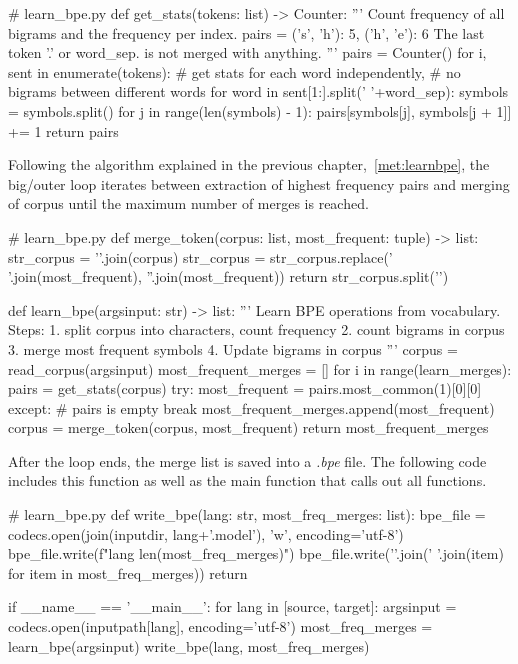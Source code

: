 \begin{python}
# learn_bpe.py
def get_stats(tokens: list) -> Counter:
  '''
  Count frequency of all bigrams and the frequency per index.
  pairs = {
    ('s', 'h'): 5,
    ('h', 'e'): 6
  }
  The last token '.' or word_sep. is not merged with anything.
  '''
  pairs = Counter()
  for i, sent in enumerate(tokens):
    # get stats for each word independently, 
    # no bigrams between different words
    for word in sent[1:].split(' '+word_sep):
      symbols = symbols.split()
      for j in range(len(symbols) - 1):
        pairs[symbols[j], symbols[j + 1]] += 1
  return pairs
\end{python}

Following the algorithm explained in the previous chapter,~\ref{met:learnbpe}, the big/outer loop iterates between extraction of highest frequency pairs and merging of corpus until the maximum number of merges is reached.

\begin{python}
# learn_bpe.py
def merge_token(corpus: list, most_frequent: tuple) -> list:
  str_corpus = '\n'.join(corpus)
  str_corpus = str_corpus.replace(' '.join(most_frequent), ''.join(most_frequent))
  return str_corpus.split('\n')

def learn_bpe(argsinput: str) -> list:
  '''
  Learn BPE operations from vocabulary. Steps:
  1. split corpus into characters, count frequency
  2. count bigrams in corpus
  3. merge most frequent symbols
  4. Update bigrams in corpus 
  '''
  corpus = read_corpus(argsinput)
  most_frequent_merges = []
  for i in range(learn_merges):
    pairs = get_stats(corpus)
    try:
      most_frequent = pairs.most_common(1)[0][0]
    except:
      # pairs is empty
      break
    most_frequent_merges.append(most_frequent)
    corpus = merge_token(corpus, most_frequent)
  return most_frequent_merges
\end{python}

After the loop ends, the merge list is saved into a \emph{.bpe} file. The following code includes this function as well as the main function that calls out all functions.

\begin{python}
# learn_bpe.py
def write_bpe(lang: str, most_freq_merges: list):
  bpe_file = codecs.open(join(inputdir, lang+'.model'), 'w', encoding='utf-8')
  bpe_file.write(f"{lang} {len(most_freq_merges)}\n")
  bpe_file.write('\n'.join(' '.join(item) for item in most_freq_merges))
  return

if __name__ == '__main__':
  for lang in [source, target]:
    argsinput = codecs.open(inputpath[lang], encoding='utf-8')
    most_freq_merges = learn_bpe(argsinput)
    write_bpe(lang, most_freq_merges)
\end{python}

